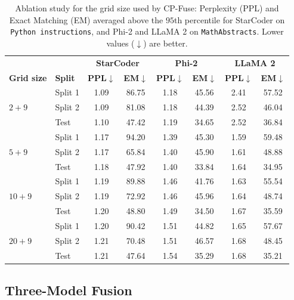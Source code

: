 \begin{table}[!tbp]
\centering
\caption{Ablation study for the grid size used by CP-Fuse: Perplexity (PPL) and Exact Matching (EM) averaged above the \(95\)th percentile for StarCoder on \texttt{Python instructions}, and Phi-2 and LLaMA 2 on \texttt{MathAbstracts}. Lower values (\(\downarrow\)) are better.}
\label{tab:app-cpfuse-grid-ablation}
\scriptsize
\begin{tabular}{ll|cc|cc|cc}
\toprule
& & \multicolumn{2}{c|}{\textbf{StarCoder}} & \multicolumn{2}{c|}{\textbf{Phi-2}} & \multicolumn{2}{c}{\textbf{LLaMA 2}} \\
\textbf{Grid size} & \textbf{Split} & \textbf{PPL}\(\downarrow\) & \textbf{EM}\(\downarrow\) & \textbf{PPL}\(\downarrow\) & \textbf{EM}\(\downarrow\) & \textbf{PPL}\(\downarrow\) & \textbf{EM}\(\downarrow\) \\
\midrule
\multirow{3}{*}{\(2 + 9\)}
& Split 1 & 1.09 & 86.75 & 1.18 & 45.56 & 2.41 & 57.52 \\
& Split 2 & 1.09 & 81.08 & 1.18 & 44.39 & 2.52 & 46.04 \\
& Test    & 1.10 & 47.42 & 1.19 & 34.65 & 2.52 & 36.84 \\
\midrule
\multirow{3}{*}{\(5 + 9\)}
& Split 1 & 1.17 & 94.20 & 1.39 & 45.30 & 1.59 & 59.48 \\
& Split 2 & 1.17 & 65.84 & 1.40 & 45.90 & 1.61 & 48.88 \\
& Test    & 1.18 & 47.92 & 1.40 & 33.84 & 1.64 & 34.95 \\
\midrule
\multirow{3}{*}{\(10 + 9\)}
& Split 1 & 1.19 & 89.88 & 1.46 & 41.76 & 1.63 & 55.54 \\
& Split 2 & 1.19 & 72.92 & 1.46 & 45.96 & 1.64 & 48.74 \\
& Test    & 1.20 & 48.80 & 1.49 & 34.50 & 1.67 & 35.59 \\
\midrule
\multirow{3}{*}{\(20 + 9\)}
& Split 1 & 1.20 & 90.42 & 1.51 & 44.82 & 1.65 & 57.67 \\
& Split 2 & 1.21 & 70.48 & 1.51 & 46.57 & 1.68 & 48.45 \\
& Test    & 1.21 & 47.64 & 1.54 & 35.29 & 1.68 & 35.21 \\
\bottomrule
\end{tabular}
\end{table}

\subsection{Three-Model Fusion}

